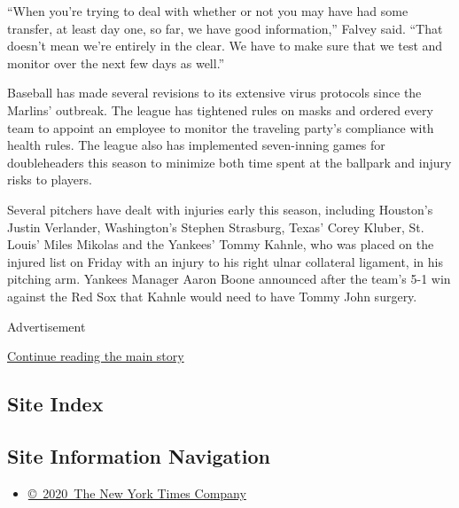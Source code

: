 ``When you're trying to deal with whether or not you may have had some
transfer, at least day one, so far, we have good information,'' Falvey
said. ``That doesn't mean we're entirely in the clear. We have to make
sure that we test and monitor over the next few days as well.''

Baseball has made several revisions to its extensive virus protocols
since the Marlins' outbreak. The league has tightened rules on masks and
ordered every team to appoint an employee to monitor the traveling
party's compliance with health rules. The league also has implemented
seven-inning games for doubleheaders this season to minimize both time
spent at the ballpark and injury risks to players.

Several pitchers have dealt with injuries early this season, including
Houston's Justin Verlander, Washington's Stephen Strasburg, Texas' Corey
Kluber, St. Louis' Miles Mikolas and the Yankees' Tommy Kahnle, who was
placed on the injured list on Friday with an injury to his right ulnar
collateral ligament, in his pitching arm. Yankees Manager Aaron Boone
announced after the team's 5-1 win against the Red Sox that Kahnle would
need to have Tommy John surgery.

Advertisement

\protect\hyperlink{after-bottom}{Continue reading the main story}

\hypertarget{site-index}{%
\subsection{Site Index}\label{site-index}}

\hypertarget{site-information-navigation}{%
\subsection{Site Information
Navigation}\label{site-information-navigation}}

\begin{itemize}
\tightlist
\item
  \href{https://help.nytimes3xbfgragh.onion/hc/en-us/articles/115014792127-Copyright-notice}{©~2020~The
  New York Times Company}
\end{itemize}


